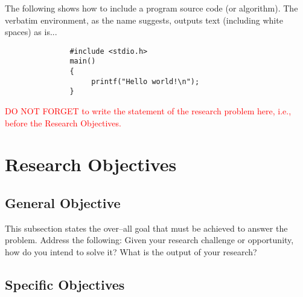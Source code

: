 The following shows how to include a program source code (or algorithm).  The verbatim environment,
as the name suggests, outputs text (including white spaces) as is...

\begin{verbatim}
               #include <stdio.h>
               main()
               {
                    printf("Hello world!\n");
               }
\end{verbatim}


\textcolor{red}{DO NOT FORGET to write the statement of the research problem here, i.e.,
before the Research Objectives.}



\section{Research Objectives}
\label{sec:researchobjectives}

\subsection{General Objective}
\label{sec:generalobjective}

This subsection states the over--all goal that must be achieved to answer the problem.
Address the following: Given your research challenge or opportunity, how do you intend 
to solve it? What is the output of your research?


\subsection{Specific Objectives}
\label{sec:specificobjectives}

%
%

